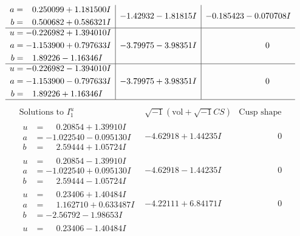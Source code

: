 \documentclass[1p]{elsarticle_modified}
\theoremstyle{definition}
\newcommand{\I}{\sqrt{-1}}
\begin{document}
$$\begin{array}{c|c|c}
\begin{aligned}
a &= \phantom{-}0.250099 + 1.181500 I \\
b &= \phantom{-}0.500682 + 0.586321 I\end{aligned}
 & -1.42932 - 1.81815 I & -0.185423 - 0.070708 I \\ \hline\begin{aligned}
u &= -0.226982 + 1.394010 I \\
a &= -1.153900 + 0.797633 I \\
b &= \phantom{-}1.89226 - 1.16346 I\end{aligned}
 & -3.79975 - 3.98351 I & \phantom{-0.000000 } 0 \\ \hline\begin{aligned}
u &= -0.226982 - 1.394010 I \\
a &= -1.153900 - 0.797633 I \\
b &= \phantom{-}1.89226 + 1.16346 I\end{aligned}
 & -3.79975 + 3.98351 I & \phantom{-0.000000 } 0\\
 \hline 
 \end{array}$$\newpage$$\begin{array}{c|c|c}  
\text{Solutions to }I^u_{1}& \I (\text{vol} + \sqrt{-1}CS) & \text{Cusp shape}\\
 \hline 
\begin{aligned}
u &= \phantom{-}0.20854 + 1.39910 I \\
a &= -1.022540 - 0.095130 I \\
b &= \phantom{-}2.59444 + 1.05724 I\end{aligned}
 & -4.62918 + 1.44235 I & \phantom{-0.000000 } 0 \\ \hline\begin{aligned}
u &= \phantom{-}0.20854 - 1.39910 I \\
a &= -1.022540 + 0.095130 I \\
b &= \phantom{-}2.59444 - 1.05724 I\end{aligned}
 & -4.62918 - 1.44235 I & \phantom{-0.000000 } 0 \\ \hline\begin{aligned}
u &= \phantom{-}0.23406 + 1.40484 I \\
a &= \phantom{-}1.162710 + 0.633487 I \\
b &= -2.56792 - 1.98653 I\end{aligned}
 & -4.22111 + 6.84171 I & \phantom{-0.000000 } 0 \\ \hline\begin{aligned}
u &= \phantom{-}0.23406 - 1.40484 I \\

\end{aligned}
\end{array}$$
\end{document}
